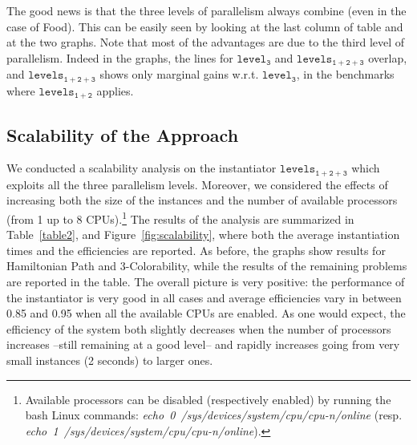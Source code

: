 \documentclass[preprint]{tlp}
\newcommand{\kali}{\ensuremath{\mathtt{levels_{1\!+\!2}}}\xspace}
\newcommand{\splitonly}{\ensuremath{\mathtt{level_3}}\xspace}
\newcommand{\paral}{\ensuremath{\mathtt{levels_{1\!+\!2\!+\!3}}}\xspace}
\begin{document}
The good news is that the three levels of parallelism always combine
(even in the case of Food). This can be easily seen by looking at the last column of table and at the two graphs.
Note that most of the advantages are due to the third level of parallelism. Indeed in the graphs, the lines
for \splitonly and \paral overlap, and \paral shows only marginal gains w.r.t. \splitonly, in the benchmarks
where \kali applies.


\subsection{Scalability of the Approach}
We conducted a scalability analysis on the instantiator \paral which exploits all the three parallelism levels.
Moreover, we considered the effects of increasing both the size of the instances and the number of available processors (from 1 up to 8 CPUs).\footnote{
Available processors can be disabled (respectively enabled) by running the bash Linux commands:
\mbox{{\em echo 0  /sys/devices/system/cpu/cpu-n/online}} (resp. \mbox{{\em echo 1  /sys/devices/system/cpu/cpu-n/online}}).
}
The results of  the analysis are summarized in Table~\ref{table2}, and
Figure~\ref{fig:scalability}, where both the average instantiation times and the efficiencies are reported.
As before, the graphs show results for Hamiltonian Path and 3-Colorability,
while the results of the remaining problems are reported in the table.
The overall picture is very positive: the performance of the instantiator
is very good in all cases and average efficiencies vary in between 0.85 and 0.95 when all the available CPUs are enabled.
As one would expect, the efficiency of the system both slightly decreases when the number of processors
increases --still remaining at a good level-- and rapidly increases going from very small instances
(2 seconds) to larger ones.

\begin{figure*}[t]
\centering
{}
\hspace{0.0cm}
\hspace{5mm}
\centering
{}
\hspace{0.0cm}
\hspace{5mm}
\caption{Hamiltonian Path and 3-Colorability: average instantiation times (s) and efficiency}\label{fig:scalability}
\end{figure*}
\end{document}
